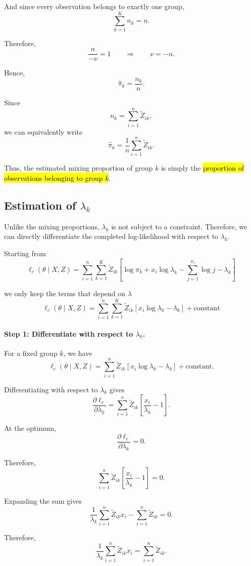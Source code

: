 And since every observation belongs to exactly one group,
\[
\sum_{k=1}^Kn_k=n.
\]

Therefore,
\[
\frac{n}{-\nu}=1
\qquad\Longrightarrow\qquad
\nu=-n.
\]

Hence,
\[
\boxed{
\hat{\pi}_k=\frac{n_k}{n}
}.
\]

Since
\[
n_k=\sum_{i=1}^n\tilde{Z}_{ik},
\]
we can equivalently write
\[
\boxed{
\hat{\pi}_k=\frac{1}{n}\sum_{i=1}^n\tilde{Z}_{ik}
}.
\]

Thus, the estimated mixing proportion of group $k$ is simply the
\hl{proportion of observations belonging to group $k$}.

\subsection{Estimation of $\lambda_k$}

Unlike the mixing proportions, $\lambda_k$ is not subject to a constraint. Therefore, we can directly differentiate the completed log-likelihood with respect to $\lambda_k$.

Starting from
\[
\ell_c(\theta \mid X, Z) = \sum_{i=1}^n \sum_{k=1}^K \tilde{Z}_{ik} [\log \pi_k + x_i\log \lambda_k - \sum_{j=1}^{x_i} \log j - \lambda_k]
\]

we only keep the terms that depend on $\lambda$
\[
\ell_c(\theta \mid X, Z) = \sum_{i=1}^n \sum_{k=1}^K \tilde{Z}_{ik} [x_i\log \lambda_k - \lambda_k] + \text{constant}
\]

\paragraph{Step 1: Differentiate with respect to $\lambda_k$.}

For a fixed group $k$, we have
\[
\ell_c(\theta \mid X, Z) = \sum_{i=1}^n \tilde{Z}_{ik} [x_i\log \lambda_k - \lambda_k] + \text{constant}.
\]

Differentiating with respect to $\lambda_k$ gives
\[
\frac{\partial \ell_c}{\partial \lambda_k}
=
\sum_{i=1}^n \tilde{Z}_{ik}
\left[
\frac{x_i}{\lambda_k}-1
\right].
\]

At the optimum,
\[
\frac{\partial \ell_c}{\partial \lambda_k}=0.
\]

Therefore,
\[
\sum_{i=1}^n \tilde{Z}_{ik}
\left[
\frac{x_i}{\lambda_k}-1
\right]
=0.
\]

Expanding the sum gives
\[
\frac{1}{\lambda_k}\sum_{i=1}^n \tilde{Z}_{ik}x_i
-
\sum_{i=1}^n \tilde{Z}_{ik}
=0.
\]

Therefore,
\[
\frac{1}{\lambda_k}\sum_{i=1}^n \tilde{Z}_{ik}x_i
=
\sum_{i=1}^n \tilde{Z}_{ik}.
\]

